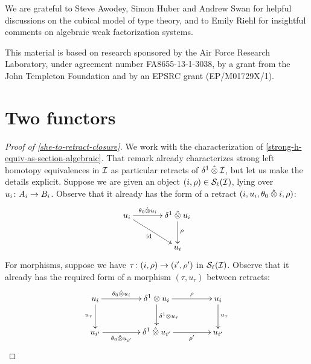 \documentclass[reqno,10pt,a4paper,oneside]{amsart}
\begin{document}
We are grateful to Steve Awodey, Simon Huber and Andrew Swan for helpful discussions on the cubical model of type theory,
and to Emily Riehl for insightful comments on algebraic weak factorization systems.

This material is based on research sponsored by the Air Force Research Laboratory, under agreement number FA8655-13-1-3038, by a grant from the John Templeton Foundation and by an EPSRC grant (EP/M01729X/1).


\appendix

\section{Two functors}
\label{app:two-functors}

\begin{proof}[Proof of \cref{she-to-retract-closure}]
We work with the characterization of \cref{strong-h-equiv-as-section-algebraic}.
That remark already characterizes strong left homotopy equivalences in $\cal{I}$ as particular retracts of $\rcyl \hatotimes \cal{I}$, but let us make
the details explicit. Suppose we are given an object $(i, \rho) \in \cal{S}_\ell(\cal{I})$, lying over $u_i \co A_i \to B_i$.
Observe that it already has the form of a retract $(i, u_i, \thetal \hatotimes i, \rho)$:
\[
\xymatrix@C+1em{
 u_i 
  \ar[r]^-{\thetal \hatotimes u_i}
  \ar[dr]_{\id}
&
  \rcyl \hatotimes u_i  \ar[d]^{\rho}
\\&
  u_i
}
\]
For morphisms, suppose we have $\tau \co (i, \rho) \to (i', \rho')$ in $\cal{S}_\ell(\cal{I})$.
Observe that it already has the required form of a morphism $(\tau, u_\tau)$ between retracts:
\[
\xymatrix@C+2em{
  u_i
  \ar[r]^-{\thetal \hatotimes u_i}
  \ar[d]_{u_\tau}
  &
  \rcyl \otimes u_i
  \ar[r]^-{\rho}
  \ar[d]^{\rcyl \otimes u_\tau}
&
  u_i
  \ar[d]^{u_\tau}
\\
 u_{i'} 
  \ar[r]_-{\thetal \hatotimes u_{i'}}
&
  \rcyl \hatotimes u_{i'}
  \ar[r]_-{\rho'}
&
  u_{i'} 
}
\]
\end{proof}
\end{document}
